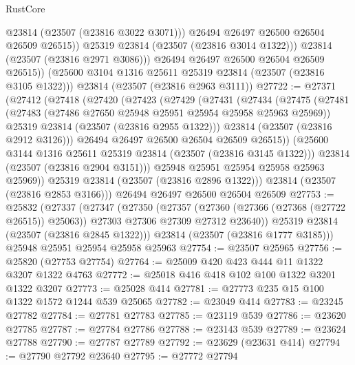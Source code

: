 \begin{lexlean}{RustCore}
\begin{coremodule}
                  @23814
                  (@23507 (@23816 @3022 @3071)))
                @26494
                @26497
                @26500
                @26504
                @26509
                @26515))
            @25319
            @23814
            (@23507 (@23816 @3014 @1322)))
          @23814
          (@23507 (@23816 @2971 @3086)))
        @26494
        @26497
        @26500
        @26504
        @26509
        @26515))
    (@25600 @3104 @1316 @25611 @25319 @23814 (@23507 (@23816 @3105 @1322)))
    @23814
    (@23507 (@23816 @2963 @3111))
@27722 := @27371
    (@27412
      (@27418
        (@27420
          (@27423
            (@27429
              (@27431
                (@27434
                  (@27475
                    (@27481
                      (@27483 (@27486 @27650 @25948 @25951 @25954 @25958 @25963 @25969))
                      @25319
                      @23814
                      (@23507 (@23816 @2955 @1322)))
                    @23814
                    (@23507 (@23816 @2912 @3126)))
                  @26494
                  @26497
                  @26500
                  @26504
                  @26509
                  @26515))
              (@25600 @3144 @1316 @25611 @25319 @23814 (@23507 (@23816 @3145 @1322)))
              @23814
              (@23507 (@23816 @2904 @3151)))
            @25948
            @25951
            @25954
            @25958
            @25963
            @25969))
        @25319
        @23814
        (@23507 (@23816 @2896 @1322)))
      @23814
      (@23507 (@23816 @2853 @3166)))
    @26494
    @26497
    @26500
    @26504
    @26509
@27753 := @25832
    (@27337
      (@27347
        (@27350
          (@27357
            (@27360 (@27366 (@27368 (@27722 @26515)) @25063))
            @27303
            @27306
            @27309
            @27312
            @23640))
        @25319
        @23814
        (@23507 (@23816 @2845 @1322)))
      @23814
      (@23507 (@23816 @1777 @3185)))
    @25948
    @25951
    @25954
    @25958
    @25963
@27754 := @23507 @25965
@27756 := @25820 (@27753 @27754)
@27764 := @25009 @420 @423 @444 @11 @1322 @3207 @1322 @4763
@27772 := @25018 @416 @418 @102 @100 @1322 @3201 @1322 @3207
@27773 := @25028 @414
@27781 := @27773 @235 @15 @100 @1322 @1572 @1244 @539 @25065
@27782 := @23049 @414
@27783 := @23245 @27782
@27784 := @27781 @27783
@27785 := @23119 @539
@27786 := @23620 @27785
@27787 := @27784 @27786
@27788 := @23143 @539
@27789 := @23624 @27788
@27790 := @27787 @27789
@27792 := @23629 (@23631 @414)
@27794 := @27790 @27792 @23640
@27795 := @27772 @27794

\end{coremodule}
\end{lexlean}
